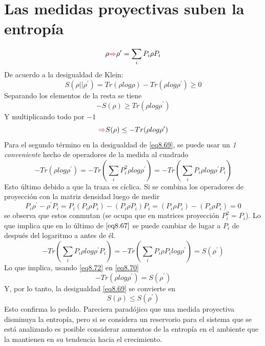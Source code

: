 \documentclass{book}
\begin{document}
\section{{Las medidas proyectivas suben la entropía}}
\begin{equation}\label{eq8.66}{\rho\textcolor{red}{\Rightarrow}\rho^\prime=\sum_i P_i \rho P_i}\end{equation}
De acuerdo a la desigualdad de Klein:
\begin{equation}\label{eq8.67}{S(\rho ||\rho^\prime)=Tr(\rho log\rho)-Tr(\rho log \rho^\prime) \geq 0}\end{equation}
Separando los elementos de la resta se tiene 
\begin{equation}\label{eq8.68}{-S(\rho)\geq Tr(\rho log \rho^\prime)}\end{equation}
Y multiplicando todo por $-1$
\begin{equation}\label{eq8.69}{\textcolor{red}{\Rightarrow} S(\rho)\leq -Tr(\rho log \rho^\prime)}\end{equation}
Para el segundo término en la desigualdad de \ref{eq8.69}, se puede usar un \textit{1 conveniente} hecho de operadores de la medida al cuadrado 
\begin{equation}\label{eq8.70}{ -Tr(\rho log \rho^\prime)=-Tr(\sum_i P_i^2 \rho log \rho^\prime)=-Tr(\sum_i P_i \rho log \rho^\prime P_i) }\end{equation}
Esto último debido a que la traza es cíclica. Si se combina los operadores de proyección con la matriz densidad luego de medir
\begin{equation}\label{eq8.71}{ P_i\rho^\prime-\rho^\prime P_i=P_i(P_i\rho P_i)-(P_i\rho P_i)P_i=(P_i\rho P_i)-(P_i\rho P_i)=0}\end{equation}
se observa que estos conmutan (se ocupa que en matrices proyección $P_i^2=P_i$). Lo que implica que en lo último de $\ref{eq8.67}$ se puede cambiar de lugar a $P_i$ de después del logaritmo a antes de él.
\begin{equation}\label{eq8.72}{-Tr(\sum_i P_i \rho log \rho^\prime P_i)=-Tr(\sum_i P_i \rho P_i log\rho^\prime )=S(\rho^\prime)}\end{equation}
Lo que implica, usando \ref{eq8.72} en \ref{eq8.70}
\begin{equation}\label{eq8.73}{-Tr(\rho log \rho^\prime)=S(\rho^\prime)}\end{equation}
Y, por lo tanto, la desigualdad \ref{eq8.69} se convierte en 
\begin{equation}\label{eq8.74}{S(\rho)\leq S(\rho^\prime)}\end{equation}
Esto confirma lo pedido. Pareciera paradójico que una medida proyectiva disminuya la entropía, pero si se considera un reservorio para el sistema que se está analizando es posible considerar aumentos de la entropía en el ambiente que la mantienen en su tendencia hacia el crecimiento. 
\end{document}
